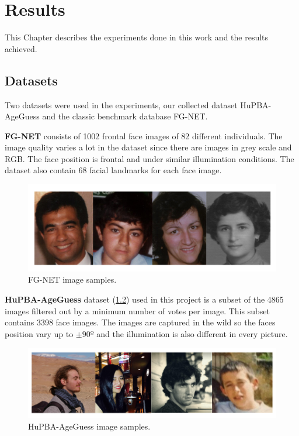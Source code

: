 \chapter{Results} \label{chap:experiments}

This Chapter describes the experiments done in this work and the results achieved.

\section{Datasets}
Two datasets were used in the experiments, our collected dataset HuPBA-AgeGuess and the classic benchmark database FG-NET.

\textbf{FG-NET} consists of 1002 frontal face images of 82 different individuals. The image quality varies a lot in the dataset since there are images in grey scale and RGB. The face position is frontal and under similar illumination conditions. The dataset also contain 68 facial landmarks for each face image.

\begin{figure}[!h]
	\centering
	\includegraphics[width=\textwidth]{figures/FGNET_sample}
	\caption{FG-NET image samples.}
	\label{fig:imgSample1}
\end{figure}

\textbf{HuPBA-AgeGuess} dataset (\ref{fig:imgSample2}) used in this project is a subset of the 4865 images filtered out by a minimum number of votes per image. This subset contains 3398 face images. The images are captured in the wild so the faces position vary up to $\pm90º$ and the illumination is also different in every picture.

\begin{figure}[!h]
	\centering
	\includegraphics[width=\textwidth]{figures/HuPBA_sample}
	\caption{HuPBA-AgeGuess image samples.}
	\label{fig:imgSample2}
\end{figure}

